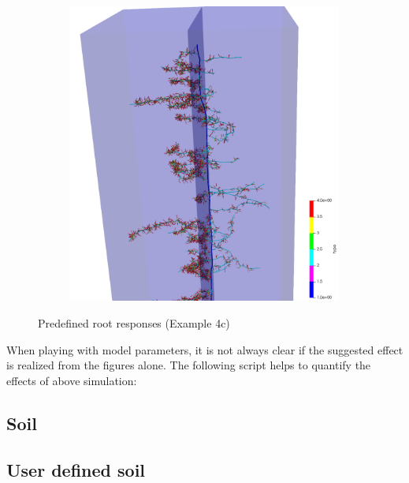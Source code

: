 \documentclass[a4paper]{article}
\begin{document}
\begin{figure}
\begin{subfigure}[c]{0.3\textwidth}
 \label{fig:insertion}
\end{subfigure}
\begin{subfigure}[c]{0.3\textwidth}
\includegraphics[width=0.99\textwidth]{example4c3.png}
 \label{fig:probability}
\end{subfigure}
\caption{Predefined root responses (Example 4c)}
\end{figure}

When playing with model parameters, it is not always clear if the suggested effect is realized from the figures alone. The following script helps to quantify the effects of above simulation: 




\subsection{Soil} \label{sec:soil}


\subsection{User defined soil} \label{sec:usersoil}
\end{document}

